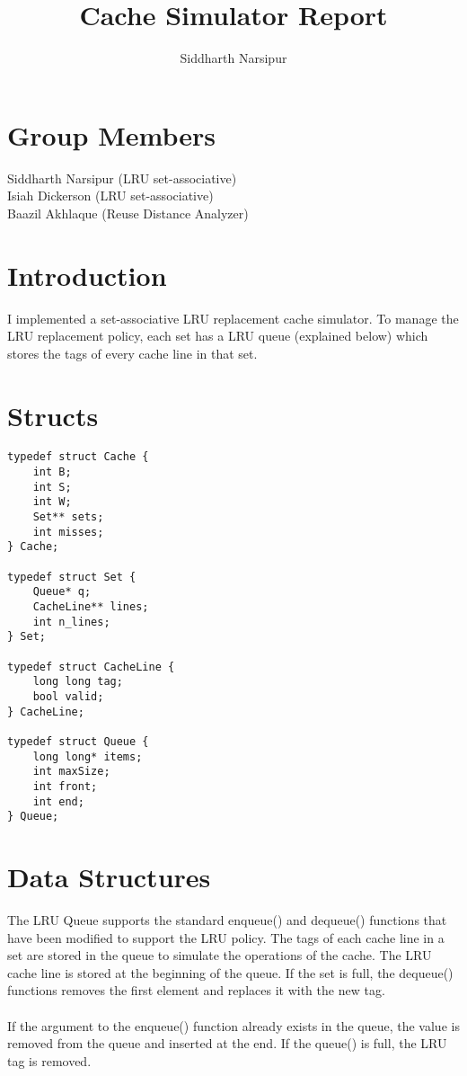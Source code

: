 \documentclass{article}
\title{Cache Simulator Report}
\author{Siddharth Narsipur }
\begin{document}
\maketitle

\section{Group Members}

Siddharth Narsipur (LRU set-associative) \\
Isiah Dickerson (LRU set-associative) \\
Baazil Akhlaque (Reuse Distance Analyzer)

\section{Introduction}

I implemented a set-associative LRU replacement cache simulator. To manage the LRU replacement policy, each set has a LRU queue (explained below) which stores the tags of every cache line in that set. 

\section{Structs}

\begin{verbatim}
typedef struct Cache {
    int B;
    int S;
    int W;
    Set** sets;
    int misses;
} Cache;

typedef struct Set {
    Queue* q;
    CacheLine** lines;
    int n_lines;
} Set;

typedef struct CacheLine {
    long long tag;
    bool valid;
} CacheLine;

typedef struct Queue {
    long long* items;
    int maxSize;
    int front;
    int end;
} Queue;
\end{verbatim}

\section{Data Structures}

The LRU Queue supports the standard enqueue() and dequeue() functions that have been modified to support the LRU policy. The tags of each cache line in a set are stored in the queue to simulate the operations of the cache.  The LRU cache line is stored at the beginning of the queue. If the set is full, the dequeue() functions removes the first element and replaces it with the new tag.
\\ \\
If the argument to the  enqueue() function already exists in the queue, the value is removed from the queue and inserted at the end. If the queue() is full, the LRU tag is removed.
\end{document}
